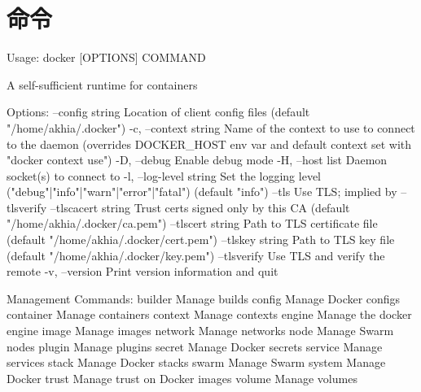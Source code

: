 \chapter{命令}
\newpage

Usage:  docker [OPTIONS] COMMAND

A self-sufficient runtime for containers

Options:
      --config string      Location of client config files (default "/home/akhia/.docker")
  -c, --context string     Name of the context to use to connect to the daemon (overrides DOCKER_HOST env var and default context set with "docker context use")
  -D, --debug              Enable debug mode
  -H, --host list          Daemon socket(s) to connect to
  -l, --log-level string   Set the logging level ("debug"|"info"|"warn"|"error"|"fatal") (default "info")
      --tls                Use TLS; implied by --tlsverify
      --tlscacert string   Trust certs signed only by this CA (default "/home/akhia/.docker/ca.pem")
      --tlscert string     Path to TLS certificate file (default "/home/akhia/.docker/cert.pem")
      --tlskey string      Path to TLS key file (default "/home/akhia/.docker/key.pem")
      --tlsverify          Use TLS and verify the remote
  -v, --version            Print version information and quit

Management Commands:
  builder     Manage builds
  config      Manage Docker configs
  container   Manage containers
  context     Manage contexts
  engine      Manage the docker engine
  image       Manage images
  network     Manage networks
  node        Manage Swarm nodes
  plugin      Manage plugins
  secret      Manage Docker secrets
  service     Manage services
  stack       Manage Docker stacks
  swarm       Manage Swarm
  system      Manage Docker
  trust       Manage trust on Docker images
  volume      Manage volumes

